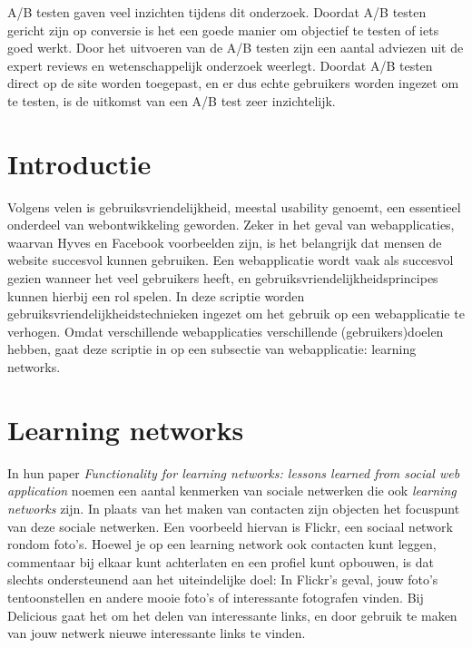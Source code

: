 \documentclass[a4paper, 10pt, pdftex]{report}
\begin{document}
    A/B testen gaven veel inzichten tijdens dit onderzoek. Doordat A/B testen gericht zijn op conversie is het een goede manier om objectief te testen of iets goed werkt. Door het uitvoeren van de A/B testen zijn een aantal adviezen uit de expert reviews en wetenschappelijk onderzoek weerlegt. Doordat A/B testen direct op de site worden toegepast, en er dus echte gebruikers worden ingezet om te testen, is de uitkomst van een A/B test zeer inzichtelijk.

  \newpage
  \setcounter{tocdepth}{1}
  \tableofcontents

  \newpage
  \section*{Introductie}
    Volgens velen is gebruiksvriendelijkheid, meestal usability genoemt, een essentieel onderdeel van webontwikkeling geworden. Zeker in het geval van webapplicaties, waarvan Hyves en Facebook voorbeelden zijn, is het belangrijk dat mensen de website succesvol kunnen gebruiken. Een webapplicatie wordt vaak als succesvol gezien wanneer het veel gebruikers heeft, en gebruiksvriendelijkheidsprincipes kunnen hierbij een rol spelen. In deze scriptie worden gebruiksvriendelijkheidstechnieken ingezet om het gebruik op een webapplicatie te verhogen. Omdat verschillende webapplicaties verschillende (gebruikers)doelen hebben, gaat deze scriptie in op een subsectie van webapplicatie: learning networks.

    \section{Learning networks}
            In hun paper \emph{Functionality for learning networks: lessons learned from social web application} noemen \citeauthor{Berlanga2007} een aantal kenmerken van sociale netwerken die ook \emph{learning networks} zijn. In plaats van het maken van contacten zijn objecten het focuspunt van deze sociale netwerken. Een voorbeeld hiervan is Flickr, een sociaal network rondom foto's. Hoewel je op een learning network ook contacten kunt leggen, commentaar bij elkaar kunt achterlaten en een profiel kunt opbouwen, is dat slechts ondersteunend aan het uiteindelijke doel: In Flickr's geval, jouw foto's tentoonstellen en andere mooie foto's of interessante fotografen vinden. Bij Delicious gaat het om het delen van interessante links, en door gebruik te maken van jouw netwerk nieuwe interessante links te vinden.
\end{document}
